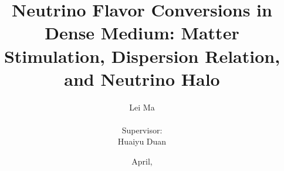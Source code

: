 \documentclass[botnum]{unmeethesis}
\begin{document}
\frontmatter




\title{Neutrino Flavor Conversions in Dense Medium: Matter Stimulation, Dispersion Relation, and Neutrino Halo}

\author{Lei Ma\\
\vspace{3em}
\\
Supervisor: \\
Huaiyu Duan}





\previousdegrees{}%

\date{April, \thisyear}

\maketitle






\maketitleabstract %



\tableofcontents
\listoffigures
\listoftables




\mainmatter






% 





\printbibliography

%
%


%
%
\end{document}
